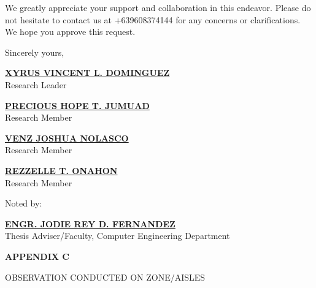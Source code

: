 \noindent We greatly appreciate your support and collaboration in this endeavor. Please do not hesitate to contact us at +639608374144 for any concerns or clarifications. We hope you approve this request.

\vspace{8pt}

\noindent Sincerely yours,

\vspace{16pt}

\begin{minipage}[t]{0.48\textwidth}
	\noindent\underline{\textbf{XYRUS VINCENT L. DOMINGUEZ}}\\
	Research Leader
\end{minipage}%
\hfill
\begin{minipage}[t]{0.48\textwidth}
	\noindent\underline{\textbf{PRECIOUS HOPE T. JUMUAD}}\\
	Research Member
\end{minipage}

\vspace{8pt}

\begin{minipage}[t]{0.48\textwidth}
	\noindent\underline{\textbf{VENZ JOSHUA NOLASCO}}\\
	Research Member
\end{minipage}%
\hfill
\begin{minipage}[t]{0.48\textwidth}
	\noindent \underline{\textbf{REZZELLE T. ONAHON}}\\
	Research Member
\end{minipage}

\vspace{16pt}

\noindent Noted by:

\vspace{8pt}

\noindent \underline{\textbf{ENGR. JODIE REY D. FERNANDEZ}}\\
Thesis Adviser/Faculty, Computer Engineering Department

\clearpage

\begin{center}
	{\bf APPENDIX C}\\[24pt]
\end{center}

\begin{center}
	OBSERVATION CONDUCTED ON ZONE/AISLES
\end{center}

